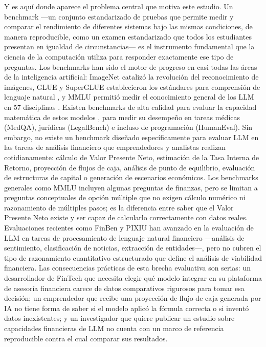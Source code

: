 \documentclass[12pt,a4paper]{article}
\begin{document}
Y es aquí donde aparece el problema central que motiva este estudio. Un benchmark ---un conjunto estandarizado de pruebas que permite medir y comparar el rendimiento de diferentes sistemas bajo las mismas condiciones, de manera reproducible, como un examen estandarizado que todos los estudiantes presentan en igualdad de circunstancias--- es el instrumento fundamental que la ciencia de la computación utiliza para responder exactamente ese tipo de preguntas. Los benchmarks han sido el motor de progreso en casi todas las áreas de la inteligencia artificial: ImageNet catalizó la revolución del reconocimiento de imágenes, GLUE y SuperGLUE establecieron los estándares para comprensión de lenguaje natural \citep{Wang2019}, y MMLU permitió medir el conocimiento general de los LLM en 57 disciplinas \citep{Hendrycks2021}. Existen benchmarks de alta calidad para evaluar la capacidad matemática de estos modelos \citep{Cobbe2021, Hendrycks2021b}, para medir su desempeño en tareas médicas (MedQA), jurídicas (LegalBench) e incluso de programación (HumanEval). Sin embargo, no existe un benchmark diseñado específicamente para evaluar LLM en las tareas de análisis financiero que emprendedores y analistas realizan cotidianamente: cálculo de Valor Presente Neto, estimación de la Tasa Interna de Retorno, proyección de flujos de caja, análisis de punto de equilibrio, evaluación de estructuras de capital o generación de escenarios económicos. Los benchmarks generales como MMLU incluyen algunas preguntas de finanzas, pero se limitan a preguntas conceptuales de opción múltiple que no exigen cálculo numérico ni razonamiento de múltiples pasos; es la diferencia entre saber que el Valor Presente Neto existe y ser capaz de calcularlo correctamente con datos reales. Evaluaciones recientes como FinBen \citep{Xie2024} y PIXIU \citep{Xie2023} han avanzado en la evaluación de LLM en tareas de procesamiento de lenguaje natural financiero ---análisis de sentimiento, clasificación de noticias, extracción de entidades---, pero no cubren el tipo de razonamiento cuantitativo estructurado que define el análisis de viabilidad financiera. Las consecuencias prácticas de esta brecha evaluativa son serias: un desarrollador de FinTech que necesita elegir qué modelo integrar en su plataforma de asesoría financiera carece de datos comparativos rigurosos para tomar esa decisión; un emprendedor que recibe una proyección de flujo de caja generada por IA no tiene forma de saber si el modelo aplicó la fórmula correcta o si inventó datos inexistentes; y un investigador que quiere publicar un estudio sobre capacidades financieras de LLM no cuenta con un marco de referencia reproducible contra el cual comparar sus resultados.
\end{document}
